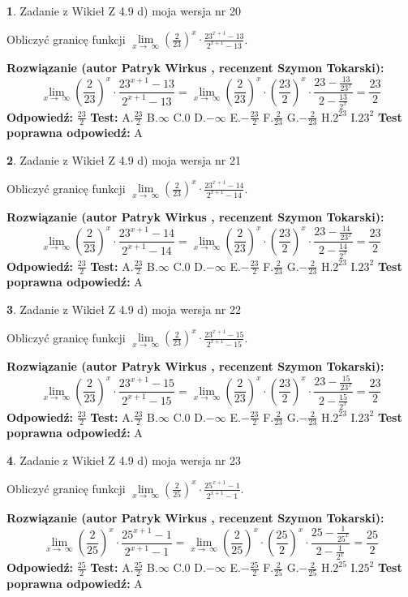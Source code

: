 \documentclass[12pt, a4paper]{article}
\theoremstyle{definition} %
\newtheorem{zad}{}
\newcommand{\zadStart}[1]{\begin{zad}#1\newline}
\newcommand{\zadStop}{\end{zad}}
\newcommand{\rozwStart}[2]{\noindent \textbf{Rozwiązanie (autor #1 , recenzent #2): }\newline}
\newcommand{\rozwStop}{\newline}
\newcommand{\odpStart}{\noindent \textbf{Odpowiedź:}\newline}
\newcommand{\odpStop}{\newline}
\newcommand{\testStart}{\noindent \textbf{Test:}\newline}
\newcommand{\testStop}{\newline}
\newcommand{\kluczStart}{\noindent \textbf{Test poprawna odpowiedź:}\newline}
\newcommand{\kluczStop}{\newline}
\begin{document}
\zadStart{Zadanie z Wikieł Z 4.9 d) moja wersja nr 20}


Obliczyć granicę funkcji  $\lim\limits_{x\to\ \infty}(\frac{2}{23})^{x}\cdot\frac{23^{x+1}-13}{2^{x+1}-13}$.
\zadStop
\rozwStart{Patryk Wirkus}{Szymon Tokarski}
$$\lim\limits_{x\to\ \infty}(\frac{2}{23})^{x}\cdot\frac{23^{x+1}-13}{2^{x+1}-13}=\lim\limits_{x\to\ \infty}(\frac{2}{23})^{x}\cdot(\frac{23}{2})^{x} \cdot \frac{23-\frac{13}{23^{x}}}{2-\frac{13}{2^{x}}} = \frac{23}{2}$$
\rozwStop
\odpStart
$\frac{23}{2}$
\odpStop
\testStart
A.$\frac{23}{2}$ B.$\infty$ C.$0$ D.$-\infty$ E.$-\frac{23}{2}$
F.$\frac{2}{23}$ G.$-\frac{2}{23}$
H.$2^{23}$
I.$23^{2}$
\testStop
\kluczStart
A
\kluczStop



\zadStart{Zadanie z Wikieł Z 4.9 d) moja wersja nr 21}


Obliczyć granicę funkcji  $\lim\limits_{x\to\ \infty}(\frac{2}{23})^{x}\cdot\frac{23^{x+1}-14}{2^{x+1}-14}$.
\zadStop
\rozwStart{Patryk Wirkus}{Szymon Tokarski}
$$\lim\limits_{x\to\ \infty}(\frac{2}{23})^{x}\cdot\frac{23^{x+1}-14}{2^{x+1}-14}=\lim\limits_{x\to\ \infty}(\frac{2}{23})^{x}\cdot(\frac{23}{2})^{x} \cdot \frac{23-\frac{14}{23^{x}}}{2-\frac{14}{2^{x}}} = \frac{23}{2}$$
\rozwStop
\odpStart
$\frac{23}{2}$
\odpStop
\testStart
A.$\frac{23}{2}$ B.$\infty$ C.$0$ D.$-\infty$ E.$-\frac{23}{2}$
F.$\frac{2}{23}$ G.$-\frac{2}{23}$
H.$2^{23}$
I.$23^{2}$
\testStop
\kluczStart
A
\kluczStop



\zadStart{Zadanie z Wikieł Z 4.9 d) moja wersja nr 22}


Obliczyć granicę funkcji  $\lim\limits_{x\to\ \infty}(\frac{2}{23})^{x}\cdot\frac{23^{x+1}-15}{2^{x+1}-15}$.
\zadStop
\rozwStart{Patryk Wirkus}{Szymon Tokarski}
$$\lim\limits_{x\to\ \infty}(\frac{2}{23})^{x}\cdot\frac{23^{x+1}-15}{2^{x+1}-15}=\lim\limits_{x\to\ \infty}(\frac{2}{23})^{x}\cdot(\frac{23}{2})^{x} \cdot \frac{23-\frac{15}{23^{x}}}{2-\frac{15}{2^{x}}} = \frac{23}{2}$$
\rozwStop
\odpStart
$\frac{23}{2}$
\odpStop
\testStart
A.$\frac{23}{2}$ B.$\infty$ C.$0$ D.$-\infty$ E.$-\frac{23}{2}$
F.$\frac{2}{23}$ G.$-\frac{2}{23}$
H.$2^{23}$
I.$23^{2}$
\testStop
\kluczStart
A
\kluczStop



\zadStart{Zadanie z Wikieł Z 4.9 d) moja wersja nr 23}


Obliczyć granicę funkcji  $\lim\limits_{x\to\ \infty}(\frac{2}{25})^{x}\cdot\frac{25^{x+1}-1}{2^{x+1}-1}$.
\zadStop
\rozwStart{Patryk Wirkus}{Szymon Tokarski}
$$\lim\limits_{x\to\ \infty}(\frac{2}{25})^{x}\cdot\frac{25^{x+1}-1}{2^{x+1}-1}=\lim\limits_{x\to\ \infty}(\frac{2}{25})^{x}\cdot(\frac{25}{2})^{x} \cdot \frac{25-\frac{1}{25^{x}}}{2-\frac{1}{2^{x}}} = \frac{25}{2}$$
\rozwStop
\odpStart
$\frac{25}{2}$
\odpStop
\testStart
A.$\frac{25}{2}$ B.$\infty$ C.$0$ D.$-\infty$ E.$-\frac{25}{2}$
F.$\frac{2}{25}$ G.$-\frac{2}{25}$
H.$2^{25}$
I.$25^{2}$
\testStop
\kluczStart
A
\kluczStop
\end{document}
